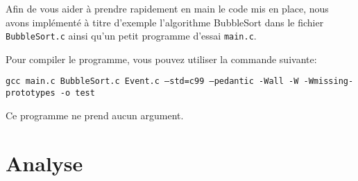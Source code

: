\documentclass[a4paper,10pt]{article}
\begin{document}
Afin de vous aider à prendre rapidement en main le code mis en place, nous avons
implémenté à titre d'exemple l'algorithme BubbleSort dans le fichier
\texttt{BubbleSort.c} ainsi qu'un petit programme d'essai \texttt{main.c}.

Pour compiler le programme, vous pouvez utiliser la commande suivante:

{\small \texttt{gcc main.c BubbleSort.c Event.c --std=c99 --pedantic -Wall -W -Wmissing-prototypes -o test}}

Ce programme ne prend aucun argument.





\section{Analyse}
\end{document}
